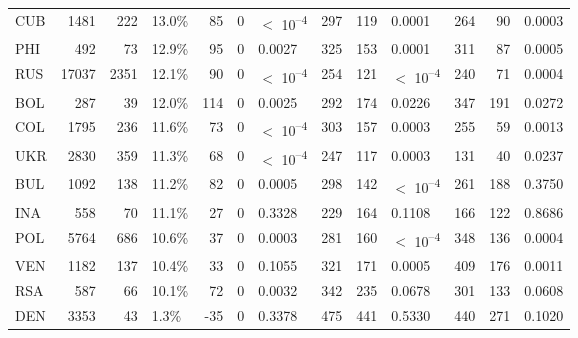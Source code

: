 \begin{tabular}[t]{lrrlrrlrrlrrl}
CUB & 1481 & 222 & 13.0\% & 85 & 0 & $<$ 10\textsuperscript{--4} & 297 & 119 & 0.0001 & 264 & 90 & 0.0003\\
PHI & 492 & 73 & 12.9\% & 95 & 0 & 0.0027 & 325 & 153 & 0.0001 & 311 & 87 & 0.0005\\
RUS & 17037 & 2351 & 12.1\% & 90 & 0 & $<$ 10\textsuperscript{--4} & 254 & 121 & $<$ 10\textsuperscript{--4} & 240 & 71 & 0.0004\\
BOL & 287 & 39 & 12.0\% & 114 & 0 & 0.0025 & 292 & 174 & 0.0226 & 347 & 191 & 0.0272\\
COL & 1795 & 236 & 11.6\% & 73 & 0 & $<$ 10\textsuperscript{--4} & 303 & 157 & 0.0003 & 255 & 59 & 0.0013\\
UKR & 2830 & 359 & 11.3\% & 68 & 0 & $<$ 10\textsuperscript{--4} & 247 & 117 & 0.0003 & 131 & 40 & 0.0237\\
BUL & 1092 & 138 & 11.2\% & 82 & 0 & 0.0005 & 298 & 142 & $<$ 10\textsuperscript{--4} & 261 & 188 & 0.3750\\
INA & 558 & 70 & 11.1\% & 27 & 0 & 0.3328 & 229 & 164 & 0.1108 & 166 & 122 & 0.8686\\
POL & 5764 & 686 & 10.6\% & 37 & 0 & 0.0003 & 281 & 160 & $<$ 10\textsuperscript{--4} & 348 & 136 & 0.0004\\
VEN & 1182 & 137 & 10.4\% & 33 & 0 & 0.1055 & 321 & 171 & 0.0005 & 409 & 176 & 0.0011\\
RSA & 587 & 66 & 10.1\% & 72 & 0 & 0.0032 & 342 & 235 & 0.0678 & 301 & 133 & 0.0608\\
DEN & 3353 & 43 & 1.3\% & -35 & 0 & 0.3378 & 475 & 441 & 0.5330 & 440 & 271 & 0.1020\\
\bottomrule
\end{tabular}
